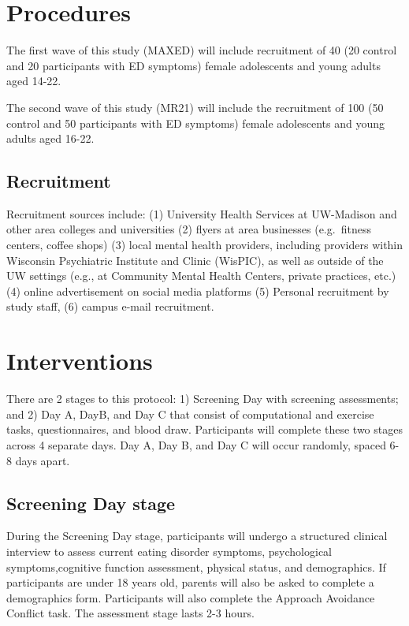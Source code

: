 \documentclass[
]{book}
\begin{document}
\chapter{Procedures}\label{procedures}

The first wave of this study (MAXED) will include recruitment of 40 (20 control and 20 participants with ED symptoms) female adolescents and young adults aged 14-22.

The second wave of this study (MR21) will include the recruitment of 100 (50 control and 50 participants with ED symptoms) female adolescents and young adults aged 16-22.

\section{Recruitment}\label{recruitment}

Recruitment sources include: (1) University Health Services at UW-Madison and other area colleges and universities (2) flyers at area businesses (e.g.~fitness centers, coffee shops) (3) local mental health providers, including providers within Wisconsin Psychiatric Institute and Clinic (WisPIC), as well as outside of the UW settings (e.g., at Community Mental Health Centers, private practices, etc.) (4) online advertisement on social media platforms (5) Personal recruitment by study staff, (6) campus e-mail recruitment.

\chapter{Interventions}\label{interventions}

There are 2 stages to this protocol: 1) Screening Day with screening assessments; and 2) Day A, DayB, and Day C that consist of computational and exercise tasks, questionnaires, and blood draw. Participants will complete these two stages across 4 separate days. Day A, Day B, and Day C will occur randomly, spaced 6-8 days apart.

\section{Screening Day stage}\label{screening-day-stage}

During the Screening Day stage, participants will undergo a structured clinical interview to assess current eating disorder symptoms, psychological symptoms,cognitive function assessment, physical status, and demographics. If participants are under 18 years old, parents will also be asked to complete a demographics form. Participants will also complete the Approach Avoidance Conflict task. The assessment stage lasts 2-3 hours.
\end{document}

